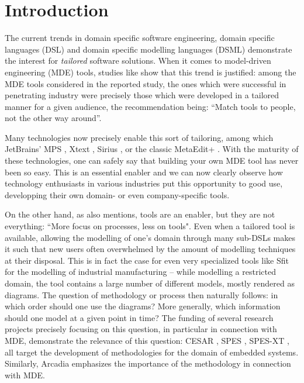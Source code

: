\section{Introduction}
\label{sec:intro}

The current trends in domain specific software engineering, domain specific
languages (DSL) and domain specific modelling languages (DSML) demonstrate the
interest for \emph{tailored} software solutions.
When it comes to model-driven engineering (MDE) tools, studies like \cite{DBLP:conf/models/WhittleHRBH13} 
show that this trend is justified: among the MDE tools considered
in the reported study, the ones which were successful in penetrating industry
were precisely those which were developed in a tailored manner for a given
audience, the recommendation being: ``Match tools to people, not the other way
around''.

Many technologies now precisely enable this sort of tailoring, among which 
JetBrains' MPS \cite{DBLP:conf/pppj/PechSV13},
Xtext \cite{DBLP:conf/oopsla/EysholdtB10},
Sirius \cite{DBLP:conf/asplos/HauswaldLZLRKDM15}, or the classic MetaEdit+ \cite{DBLP:conf/sle/Tolvanen16}.
With the maturity of these technologies, one can safely say that building your own MDE tool
has never been so easy.
This is an essential enabler and we can now clearly observe how technology
enthusiasts in various industries put this opportunity to good use, developping their own domain- or even company-specific tools.

On the other hand, as \cite{DBLP:conf/models/WhittleHRBH13} also mentions, tools are an enabler,
but they are not everything: ``More focus on processes, less on tools".
Even when a tailored tool is available, allowing the modelling of one's domain through
many sub-DSLs makes it such that new users often overwhelmed by the amount
of modelling techniques at their disposal. This is in fact the case for even
very specialized tools like Sfit \cite{DBLP:conf/vamos/BayhaLAMI16} for the
modelling of industrial manufacturing -- while modelling a restricted domain,
the tool contains a large number of different models, mostly rendered as
diagrams.
The question of methodology or process then naturally follows: in which order
should one use the diagrams? More generally, which information should one model
at a given point in time? The funding of several research projects precisely
focusing on this question, in particular in connection with MDE, demonstrate the relevance of this
question:
CESAR \cite{CESAR}, SPES \cite{DBLP:books/sp/pohl12}, SPES-XT \cite{DBLP:books/sp/spes2016},
all target the development of methodologies for the domain of embedded systems.
Similarly, Arcadia \cite{DBLP:conf/syscon/BonnetVEN16} emphasizes the importance
of the methodology in connection with MDE.

